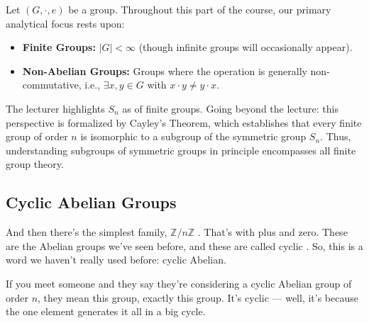 \begin{content}
Let $(G, \cdot, e)$ be a group. Throughout this part of the course, our primary analytical focus rests upon:
\begin{itemize}
    \item \textbf{Finite Groups:} $|G| < \infty$ (though infinite groups will occasionally appear).
    \item \textbf{Non-Abelian Groups:} Groups where the operation is generally non-commutative, i.e., $\exists x, y \in G$ with $x \cdot y \neq y \cdot x$.
\end{itemize}


\begin{steps}
The lecturer highlights $S_n$ as  of finite groups. Going beyond the lecture: this perspective is formalized by Cayley's Theorem, which establishes that every finite group of order $n$ is isomorphic to a subgroup of the symmetric group $S_n$. Thus, understanding subgroups of symmetric groups in principle encompasses all finite group theory.
\end{steps}
\end{content}

\subsection{Cyclic Abelian Groups}

\begin{speech}[00:01:25 - 00:02:04]
And then there's the simplest family, $\mathbb{Z} / n\mathbb{Z}$ . That's with plus and zero. These are the Abelian groups we've seen before, and these are called cyclic . So, this is a word we haven't really used before: cyclic Abelian.

If you meet someone and they say they're considering a cyclic Abelian group of order $n$, they mean this group, exactly this group. It's cyclic --- well, it's because the one element generates it all in a big cycle.
\end{speech}

